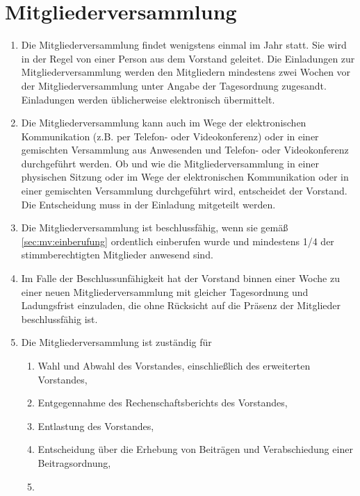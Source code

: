 \documentclass[12pt,paper=a4,ngerman]{scrreprt}
\begin{document}
	\section{Mitgliederversammlung}
	\begin{enumerate}
	    \item
	        \label{sec:mv:einberufung}
	        Die Mitgliederversammlung findet wenigstens einmal im Jahr statt. Sie wird in der Regel von einer Person aus dem Vorstand geleitet. Die Einladungen zur Mitgliederversammlung werden den Mitgliedern mindestens zwei Wochen vor der Mitgliederversammlung unter Angabe der Tagesordnung zugesandt. Einladungen werden üblicherweise elektronisch übermittelt.
        \item
            Die Mitgliederversammlung kann auch im Wege der elektronischen Kommunikation (z.B. per Telefon- oder Videokonferenz) oder in einer gemischten Versammlung aus Anwesenden und Telefon- oder Videokonferenz durchgeführt werden. Ob und wie die Mitgliederversammlung in einer physischen Sitzung oder im Wege der elektronischen Kommunikation oder in einer gemischten Versammlung durchgeführt wird, entscheidet der Vorstand. Die Entscheidung muss in der Einladung mitgeteilt werden.
        \item
            Die Mitgliederversammlung ist beschlussfähig, wenn sie gemäß \ref{sec:mv:einberufung} ordentlich einberufen wurde und mindestens 1/4 der stimmberechtigten Mitglieder anwesend sind.
        \item
            Im Falle der Beschlussunfähigkeit hat der Vorstand binnen einer Woche zu einer neuen Mitgliederversammlung mit gleicher Tagesordnung und Ladungsfrist einzuladen, die ohne Rücksicht auf die Präsenz der Mitglieder beschlussfähig ist.
        \item
            Die Mitgliederversammlung ist zuständig für
            \begin{enumerate}
                \item
                    Wahl und Abwahl des Vorstandes, einschließlich des erweiterten Vorstandes,
                \item
                    Entgegennahme des Rechenschaftsberichts des Vorstandes,
                \item
                    Entlastung des Vorstandes,
                \item
                    Entscheidung über die Erhebung von Beiträgen und Verabschiedung einer Beitragsordnung,
                \item
                    \label{sec:mv:satzungsänderung}

\end{enumerate}
\end{enumerate}
\end{document}
